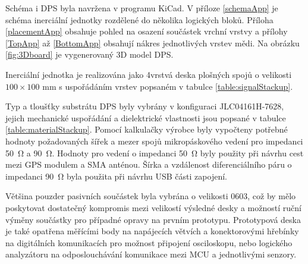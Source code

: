 Schéma i DPS byla navržena v programu KiCad. V příloze \ref{schemaApp} je schéma inerciální jednotky rozdělené do několika logických bloků. Příloha \ref{placementApp} obsahuje pohled na osazení součástek vrchní vrstvy a přílohy \ref{TopApp} až \ref{BottomApp} obsahují nákres jednotlivých vrstev mědi. Na obrázku \ref{fig:3Dboard} je vygenerovaný 3D model DPS.

Inerciální jednotka je realizována jako 4vrstvá deska plošných spojů o velikosti $ 100 \times 100 $ mm s uspořádáním vrstev popsaném v tabulce \ref{table:signalStackup}.


Typ a tloušťky substrátu DPS byly vybrány v konfiguraci JLC04161H-7628, jejich mechanické uspořádání a dielektrické vlastnosti jsou popsané v tabulce \ref{table:materialStackup}. Pomocí kalkulačky výrobce byly vypočteny potřebné hodnoty požadovaných šířek a mezer spojů mikropáskového vedení pro impedanci \SI{50}{\ohm} a \SI{90}{\ohm}. Hodnoty pro vedení o impedanci \SI{50}{\ohm} byly použity při návrhu cest mezi GPS modulem a SMA anténou. Šírka a vzdálenost diferenciálního páru o impedanci \SI{90}{\ohm} byla použita při návrhu USB části zapojení.


Většina pouzder pasivních součástek byla vybrána o velikosti 0603, což by mělo poskytovat dostatečný kompromis mezi velikostí výsledné desky a možností ruční výměny součástky pro případné opravy na prvním prototypu. Prototypová deska je také opatřena měřícími body na napájecích větvích a konektorovými hřebínky na digitálních komunikacích pro možnost připojení osciloskopu, nebo logického analyzátoru na odposlouchávání komunikace mezi MCU a jednotlivými senzory. 




